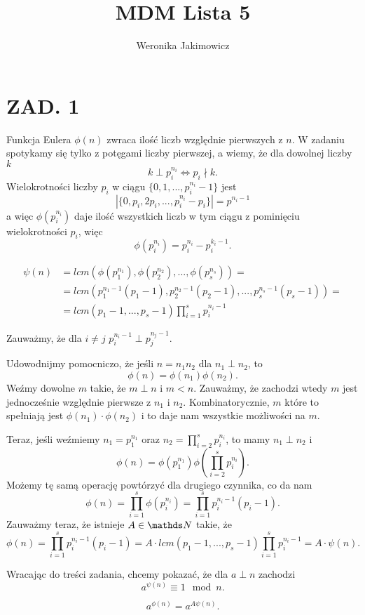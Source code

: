 \documentclass{article}[13pt]
\author{Weronika Jakimowicz}
\title{MDM Lista 5}
\date{}
\begin{document}
\maketitle

\section*{ZAD. 1}

Funkcja Eulera $\phi(n)$ zwraca ilość liczb względnie pierwszych z $n$. W zadaniu spotykamy się tylko z potęgami liczby pierwszej, a wiemy, że dla dowolnej liczby $k$
$$k\perp p_i^{n_i}\iff p_i\nmid k.$$
Wielokrotności liczby $p_i$ w ciągu $\{0,1,...,p_i^{n_i}-1\}$ jest
$$|\{0,p_i,2p_i,...,p_i^{n_i}-p_i\}|=p^{n_i-1}$$
a więc $\phi(p_i^{n_i})$ daje ilość wszystkich liczb w tym ciągu z pominięciu wielokrotności $p_i$, więc
$$\phi(p_i^{n_i})=p_i^{n_i}-p_i^{k_i-1}.$$


\begin{align*}
    \psi(n)&=lcm(\phi(p_1^{n_1}),\phi(p_2^{n_2}),...,\phi(p_s^{n_s}))=\\
    &=lcm(p_1^{n_1-1}(p_1-1),p_2^{n_2-1}(p_2-1),...,p_s^{n_s-1}(p_s-1))=\\
    &=lcm(p_1-1,...,p_s-1)\prod\limits_{i=1}^sp_i^{n_i-1}
\end{align*}

Zauważmy, że dla $i\neq j$ $p_i^{n_i-1}\perp p_j^{n_j-1}$.
\medskip

Udowodnijmy pomocniczo, że jeśli $n=n_1n_2$ dla $n_1\perp n_2$, to
$$\phi(n)=\phi(n_1)\phi(n_2).$$
Weźmy dowolne $m$ takie, że $m\perp n$ i $m<n$. Zauważmy, że zachodzi wtedy $m$ jest jednocześnie względnie pierwsze z $n_1$ i $n_2$. Kombinatorycznie, $m$ które to spełniają jest $\phi(n_1)\cdot\phi(n_2)$ i to daje nam wszystkie możliwości na $m$.
\medskip

Teraz, jeśli weźmiemy $n_1=p_1^{n_1}$ oraz $n_2=\prod\limits_{i=2}^sp_i^{n_i}$, to mamy $n_1\perp n_2$ i 
$$\phi(n)=\phi(p_1^{n_1})\phi(\prod\limits_{i=2}^sp_i^{n_i}).$$
Możemy tę samą operację powtórzyć dla drugiego czynnika, co da nam
$$\phi(n)=\prod\limits_{i=1}^s\phi(p_i^{n_i})=\prod\limits_{i=1}^sp_i^{n_i-1}(p_i-1).$$
Zauważmy teraz, że istnieje $A\in\N$ takie, że
$$\phi(n)=\prod\limits_{i=1}^sp_i^{n_i-1}(p_i-1)=A\cdot lcm(p_1-1,...,p_s-1)\prod\limits_{i=1}^sp_i^{n_i-1}=A\cdot \psi(n).$$

Wracając do treści zadania, chcemy pokazać, że dla $a\perp n$ zachodzi
$$a^{\psi(n)}\equiv 1\mod n.$$

$$a^ {\phi(n)}=a^{A\psi(n)}.$$
\end{document}
